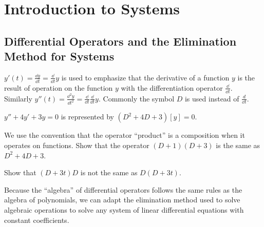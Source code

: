 \documentclass[../diffeq.tex]{subfiles}
\begin{document}
\chapter{Introduction to Systems}

\section{Differential Operators and the Elimination Method for Systems}
$y'(t)= \frac{\dd y}{\dd t}=\frac{\dd}{\dd t}y$ is used to emphasize that the derivative of a function $y$ is the result of operation on the function $y$ with the differentiation operator 
$\frac{\dd}{\dd t}$. Similarly $y''(t)=\frac{\dd^2 y}{\dd t^2}=\frac{\dd}{\dd t}\frac{\dd}{\dd t}y$. Commonly the symbol $D$ is used instead of $\frac{d}{\dd t}$.

$y''+4y'+3y=0$ is represented by $(D^2+4D+3)[y]=0$.

We use the convention that the operator ``product'' is a composition when it operates on functions.
\ex Show that the operator $(D+1)(D+3)$ is the same as $D^2+4D+3$.

\ex Show that $(D+3t)D$ is not the same as $D(D+3t)$.

Because the ``algebra'' of differential operators follows the same rules as the algebra of polynomials, we can adapt the elimination method used to solve algebraic operations to solve any system of 
linear differential equations with constant coefficients.
\end{document}
